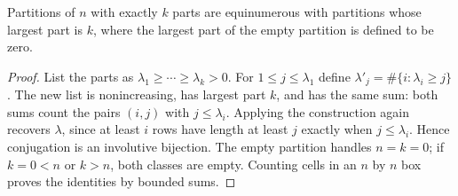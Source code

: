\begin{theorem}\label{ag:conjugate}
Partitions of $n$ with exactly $k$ parts are equinumerous with partitions whose largest part is $k$, where the largest part of the empty partition is defined to be zero.
\end{theorem}
\begin{proof}
List the parts as $\lambda_1\ge\cdots\ge\lambda_k>0$. For $1\le j\le\lambda_1$ define $\lambda'_j=\#\{i:\lambda_i\ge j\}$. The new list is nonincreasing, has largest part $k$, and has the same sum: both sums count the pairs $(i,j)$ with $j\le\lambda_i$. Applying the construction again recovers $\lambda$, since at least $i$ rows have length at least $j$ exactly when $j\le\lambda_i$. Hence conjugation is an involutive bijection. The empty partition handles $n=k=0$; if $k=0<n$ or $k>n$, both classes are empty. Counting cells in an $n$ by $n$ box proves the identities by bounded sums.
\end{proof}
